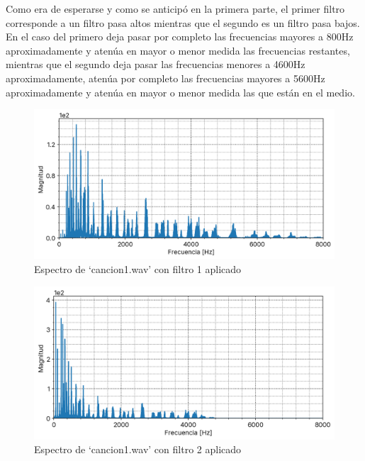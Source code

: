 \documentclass[12pt]{article}
\begin{document}
Como era de esperarse y como se anticipó en la primera parte, el primer filtro corresponde a un filtro pasa altos mientras que el segundo es un filtro pasa bajos. En el caso del primero deja pasar por completo las frecuencias mayores a 800Hz aproximadamente y atenúa en mayor o menor medida las frecuencias restantes, mientras que el segundo deja pasar las frecuencias menores a 4600Hz aproximadamente, atenúa por completo las frecuencias mayores a 5600Hz aproximadamente y atenúa en mayor o menor medida las que están en el medio.

\begin{figure}[H]
\centering
\includegraphics{plot/cancion1_filter1_output_fft.png}
\caption{Espectro de `cancion1.wav' con filtro 1 aplicado}
\label{cancion1_filter1_output_fft}
\end{figure}

\begin{figure}[H]
\centering
\includegraphics{plot/cancion1_filter2_output_fft.png}
\caption{Espectro de `cancion1.wav' con filtro 2 aplicado}
\label{cancion1_filter2_output_fft}
\end{figure}
\end{document}
